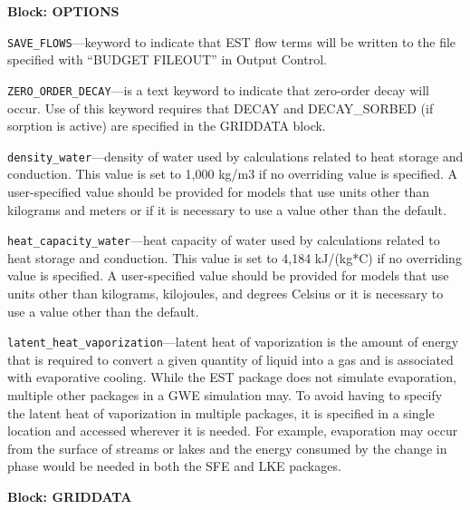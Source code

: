 
\item \textbf{Block: OPTIONS}

\begin{description}
\item \texttt{SAVE\_FLOWS}---keyword to indicate that EST flow terms will be written to the file specified with ``BUDGET FILEOUT'' in Output Control.

\item \texttt{ZERO\_ORDER\_DECAY}---is a text keyword to indicate that zero-order decay will occur.  Use of this keyword requires that DECAY and DECAY\_SORBED (if sorption is active) are specified in the GRIDDATA block.

\item \texttt{density\_water}---density of water used by calculations related to heat storage and conduction.  This value is set to 1,000 kg/m3 if no overriding value is specified.  A user-specified value should be provided for models that use units other than kilograms and meters or if it is necessary to use a value other than the default.

\item \texttt{heat\_capacity\_water}---heat capacity of water used by calculations related to heat storage and conduction.  This value is set to 4,184 kJ/(kg*C) if no overriding value is specified.  A user-specified value should be provided for models that use units other than kilograms, kilojoules, and degrees Celsius or it is necessary to use a value other than the default.

\item \texttt{latent\_heat\_vaporization}---latent heat of vaporization is the amount of energy that is required to convert a given quantity of liquid into a gas and is associated with evaporative cooling.  While the EST package does not simulate evaporation, multiple other packages in a GWE simulation may.  To avoid having to specify the latent heat of vaporization in multiple packages, it is specified in a single location and accessed wherever it is needed.  For example, evaporation may occur from the surface of streams or lakes and the energy consumed by the change in phase would be needed in both the SFE and LKE packages.

\end{description}
\item \textbf{Block: GRIDDATA}

